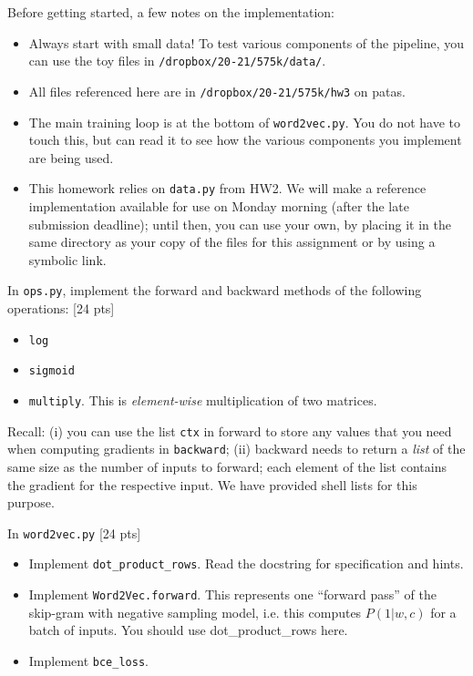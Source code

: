 \documentclass[11pt]{article}
\begin{document}
Before getting started, a few notes on the implementation:
\begin{itemize}
  \item Always start with small data!  To test various components of the pipeline, you can use the toy files in \texttt{/dropbox/20-21/575k/data/}.
  \item All files referenced here are in \texttt{/dropbox/20-21/575k/hw3} on patas.
  \item The main training loop is at the bottom of \texttt{word2vec.py}.  You do not have to touch this, but can read it to see how the various components you implement are being used.
  \item This homework relies on \texttt{data.py} from HW2. We will make a reference implementation available for use on Monday morning (after the late submission deadline); until then, you can use your own, by placing it in the same directory as your copy of the files for this assignment or by using a symbolic link.
\end{itemize}

\vspace{2em}
 In \texttt{ops.py}, implement the forward and backward methods of the following operations: [24 pts]
\begin{itemize}
  \item \texttt{log}
  \item \texttt{sigmoid}
  \item \texttt{multiply}.  This is \emph{element-wise} multiplication of two matrices.
\end{itemize}
Recall: (i) you can use the list \texttt{ctx} in forward to store any values that you need when computing gradients in \texttt{backward}; (ii) backward needs to return a \emph{list} of the same size as the number of inputs to forward; each element of the list contains the gradient for the respective input.  We have provided shell lists for this purpose.

\vspace{2em}
 In \texttt{word2vec.py} [24 pts]
\begin{itemize}
  \item Implement \texttt{dot\_product\_rows}.  Read the docstring for specification and hints.
  \item Implement \texttt{Word2Vec.forward}.  This represents one ``forward pass'' of the skip-gram with negative sampling model, i.e. this computes $P(1 | w, c)$ for a batch of inputs.  You should use dot\_product\_rows here.
  \item Implement \texttt{bce\_loss}.
\end{itemize}
\end{document}
